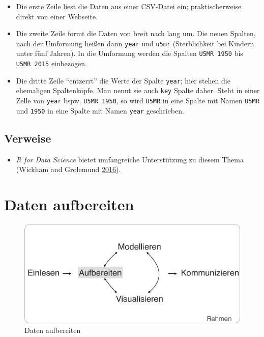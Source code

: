 \documentclass[12pt,]{book}
\providecommand{\tightlist}{%
  \setlength{\itemsep}{0pt}\setlength{\parskip}{0pt}}
\begin{document}
\begin{itemize}
\tightlist
\item
  Die erste Zeile liest die Daten aus einer CSV-Datei ein;
  praktischerweise direkt von einer Webseite.\\
\item
  Die zweite Zeile formt die Daten von breit nach lang um. Die neuen
  Spalten, nach der Umformung heißen dann \texttt{year} und
  \texttt{u5mr} (Sterblichkeit bei Kindern unter fünf Jahren). In die
  Umformung werden die Spalten \texttt{U5MR\ 1950} bis
  \texttt{U5MR\ 2015} einbezogen.
\item
  Die dritte Zeile ``entzerrt'' die Werte der Spalte \texttt{year}; hier
  stehen die ehemaligen Spaltenköpfe. Man nennt sie auch \texttt{key}
  Spalte daher. Steht in einer Zelle von \texttt{year} bspw.
  \texttt{U5MR\ 1950}, so wird \texttt{U5MR} in eine Spalte mit Namen
  \texttt{U5MR} und \texttt{1950} in eine Spalte mit Namen \texttt{year}
  geschrieben.
\end{itemize}

\section{Verweise}\label{verweise-1}

\begin{itemize}
\tightlist
\item
  \emph{R for Data Science} bietet umfangreiche Unterstützung zu diesem
  Thema (Wickham and Grolemund \protect\hyperlink{ref-r4ds}{2016}).
\end{itemize}

\chapter{Daten aufbereiten}\label{daten-aufbereiten}

\begin{figure}

{\centering \includegraphics[width=0.7\linewidth]{images/Aufbereiten} 

}

\caption{Daten aufbereiten}\label{fig:unnamed-chunk-2}
\end{figure}
\end{document}
